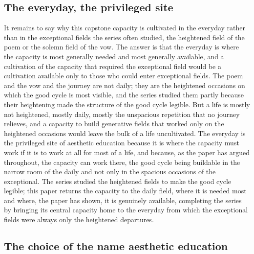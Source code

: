 \subsection{The everyday, the privileged site}
\label{p22:sub:terminus-everyday}

It remains to say why this capstone capacity is cultivated in the everyday rather than in the exceptional fields the series often studied, the heightened field of the poem or the solemn field of the vow. The answer is that the everyday is where the capacity is most generally needed and most generally available, and a cultivation of the capacity that required the exceptional field would be a cultivation available only to those who could enter exceptional fields. The poem and the vow and the journey are not daily; they are the heightened occasions on which the good cycle is most visible, and the series studied them partly because their heightening made the structure of the good cycle legible. But a life is mostly not heightened, mostly daily, mostly the unspacious repetition that no journey relieves, and a capacity to build generative fields that worked only on the heightened occasions would leave the bulk of a life uncultivated. The everyday is the privileged site of aesthetic education because it is where the capacity must work if it is to work at all for most of a life, and because, as the paper has argued throughout, the capacity can work there, the good cycle being buildable in the narrow room of the daily and not only in the spacious occasions of the exceptional. The series studied the heightened fields to make the good cycle legible; this paper returns the capacity to the daily field, where it is needed most and where, the paper has shown, it is genuinely available, completing the series by bringing its central capacity home to the everyday from which the exceptional fields were always only the heightened departures.

\subsection{The choice of the name aesthetic education}
\label{p22:sub:terminus-name}

